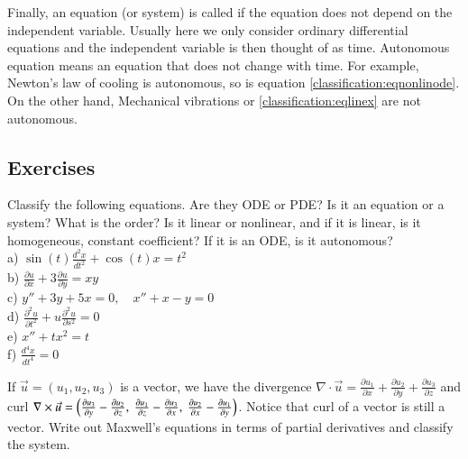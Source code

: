 \medskip

Finally, an equation (or system) is called \emph{}
if the equation does not depend on the independent variable.
Usually here we only consider ordinary differential equations and the
independent variable is then thought of as time.  Autonomous equation
means an equation that does not change with time.
For example, Newton's law of cooling is autonomous, so is equation
\eqref{classification:eqnonlinode}.  On the other hand, Mechanical
vibrations or 
\eqref{classification:eqlinex} are not autonomous.

\subsection{Exercises}

\begin{exercise}
Classify the following equations.  Are they ODE or PDE?  Is it an equation
or a system?  What is the order?  Is it linear or nonlinear, and if it is
linear, is it homogeneous, constant coefficient?  If it is an ODE, is it
autonomous?\\[3pt]
a) $\displaystyle \sin(t) \frac{d^2 x}{dt^2} + \cos(t) x = t^2$ \\[3pt]
b) $\displaystyle \frac{\partial u}{\partial x} + 3 \frac{\partial u}{\partial y} = xy$
\\[3pt]
c) $\displaystyle y''+3y+5x=0, \quad x''+x-y=0$ \\[3pt]
d) $\displaystyle \frac{\partial^2 u}{\partial t^2} + u\frac{\partial^2 u}{\partial s^2} =
0$ \\[3pt]
e) $\displaystyle x''+tx^2=t$ \\[3pt]
f) $\displaystyle \frac{d^4 x}{dt^4} = 0$
\end{exercise}

\begin{exercise}
If $\vec{u} = (u_1,u_2,u_3)$ is a vector, we have the divergence
$\nabla \cdot \vec{u} =
\frac{\partial u_1}{\partial x} +
\frac{\partial u_2}{\partial y} +
\frac{\partial u_3}{\partial z}$ and curl
$\nabla \times \vec{u} =
\Bigl(
\frac{\partial u_3}{\partial y} - \frac{\partial u_2}{\partial z} , ~
\frac{\partial u_1}{\partial z} - \frac{\partial u_3}{\partial x} , ~
\frac{\partial u_2}{\partial x} - \frac{\partial u_1}{\partial y} \Bigr)$.
Notice that curl of a vector is still a vector.  Write out Maxwell's
equations in terms of partial derivatives and classify the system.
\end{exercise}

